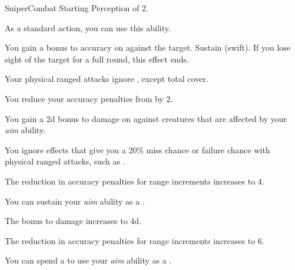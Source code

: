     \begin{feat}{Sniper}{Combat}
        \featpre Starting Perception of 2.
        \featben

         As a standard action, you can use this ability.
        \begin{ability}
            \begin{spelltargetinginfo}
            \end{spelltargetinginfo}
            \begin{spelleffects}
                \spelleffect You gain a  bonus to accuracy on  against the target.
                \spelldur Sustain (swift). If you lose sight of the target for a full round, this effect ends.
            \end{spelleffects}
        \end{ability}

         Your physical ranged attacks ignore , except total cover.

         You reduce your accuracy penalties from  by 2.

         You gain a \plus2d bonus to damage on  against \unaware creatures that are affected by your \textit{aim} ability.

         You ignore effects that give you a 20\% miss chance or failure chance with physical ranged attacks, such as .

         The reduction in accuracy penalties for range increments increases to 4.

         You can sustain your \textit{aim} ability as a .

         The bonus to damage increases to \plus4d.

         The reduction in accuracy penalties for range increments increases to 6.

         You can spend a  to use your \textit{aim} ability as a .
    \end{feat}

